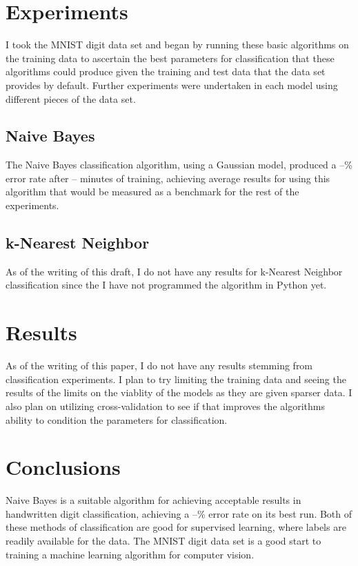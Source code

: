 \documentclass[10pt,twocolumn,letterpaper]{article}
\begin{document}
\section{Experiments}

I took the MNIST digit data set and began by running these basic algorithms on the training data to ascertain the best parameters for classification that these algorithms could produce given the training and test data that the data set provides by default. Further experiments were undertaken in each model using different pieces of the data set.

\subsection{Naive Bayes}

The Naive Bayes classification algorithm, using a Gaussian model, produced a --\% error rate after -- minutes of training, achieving average results for using this algorithm that would be measured as a benchmark for the rest of the experiments.\cite{Alpher02}

\subsection{k-Nearest Neighbor}

As of the writing of this draft, I do not have any results for k-Nearest Neighbor classification since the I have not programmed the algorithm in Python yet.

\section{Results}

As of the writing of this paper, I do not have any results stemming from classification experiments. I plan to try limiting the training data and seeing the results of the limits on the viablity of the models as they are given sparser data. I also plan on utilizing cross-validation to see if that improves the algorithms ability to condition the parameters for classification.

\section{Conclusions}

Naive Bayes is a suitable algorithm for achieving acceptable results in handwritten digit classification, achieving a --\% error rate on its best run. Both of these methods of classification are good for supervised learning, where labels are readily available for the data. The MNIST digit data set is a good start to training a machine learning algorithm for computer vision. 
\end{document}
